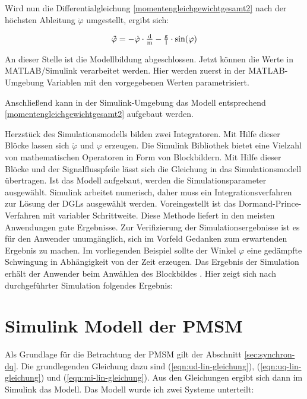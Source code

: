 Wird nun die Differentialgleichung \ref{momentengleichgewichtgesamt2} nach der höchsten Ableitung $\ddot\varphi$ umgestellt, ergibt sich:

\begin{align}
	\ddot\varphi = -\dot\varphi \cdot \tfrac{\i{d}}{\i{m}} - \tfrac{\i{g}}{\i{l}} \cdot \si{sin}(\varphi)
	\label{diffgleichung} 
\end{align}

An dieser Stelle ist die Modellbildung abgeschlossen. Jetzt können die Werte in MATLAB/Simulink  verarbeitet werden.
Hier werden zuerst in der MATLAB-Umgebung Variablen mit den vorgegebenen Werten parametrisiert.


Anschließend kann in der Simulink-Umgebung das Modell entsprechend \ref{momentengleichgewichtgesamt2} aufgebaut werden.


Herzstück des Simulationsmodells bilden zwei Integratoren.
Mit Hilfe dieser Blöcke lassen sich  $\dot{\varphi}$ und $\varphi$ erzeugen.
Die Simulink Bibliothek bietet eine Vielzahl von mathematischen Operatoren in Form von Blockbildern.
Mit Hilfe dieser Blöcke und der Signalflusspfeile lässt sich die Gleichung in das Simulationsmodell übertragen.
Ist das Modell aufgebaut, werden die Simulationsparameter ausgewählt. 
Simulink arbeitet numerisch, daher muss ein Integrationsverfahren zur Lösung der DGLs ausgewählt werden. Voreingestellt ist das Dormand-Prince-Verfahren mit variabler Schrittweite.
Diese Methode liefert in den meisten Anwendungen gute Ergebnisse. \autocite[S.~6]{scherf2010}
Zur Verifizierung der Simulationsergebnisse ist es für den Anwender unumgänglich, sich im Vorfeld Gedanken zum erwartenden Ergebnis zu machen.
Im vorliegenden Beispiel sollte der Winkel $\varphi$ eine gedämpfte Schwingung in Abhängigkeit von der Zeit erzeugen.
Das Ergebnis der Simulation erhält der Anwender beim Anwählen des Blockbildes \grqq.
Hier zeigt sich nach durchgeführter Simulation folgendes Ergebnis:


\section{Simulink Modell der PMSM}\label{sec:math-model-pmsm}

Als Grundlage für die Betrachtung der PMSM gilt der Abschnitt \ref{sec:synchron-dq}.
Die grundlegenden Gleichung dazu sind (\ref{eqn:ud-lin-gleichung}), (\ref{eqn:uq-lin-gleichung}) und (\ref{eqn:mi-lin-gleichung}).
Aus den Gleichungen ergibt sich dann im Simulink das Modell.
Das Modell wurde ich zwei Systeme unterteilt:


